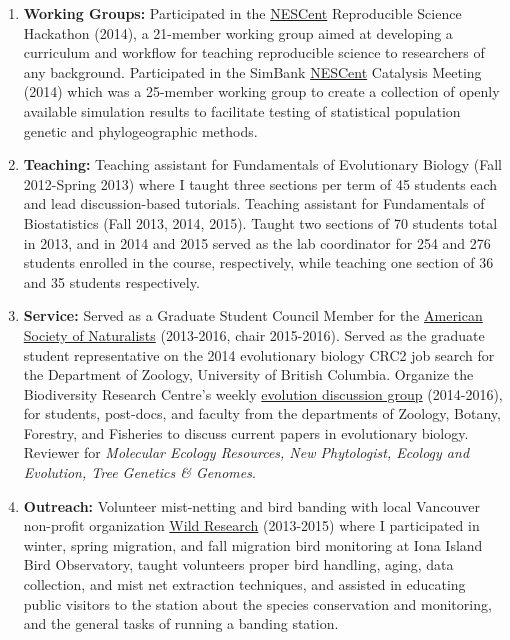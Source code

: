 \begin{enumerate}[itemsep=-0.25ex]
\item \textbf{Working Groups:} Participated in the \href{http://www.nescent.org/}{NESCent} Reproducible Science Hackathon (2014), a 21-member working group aimed at developing a curriculum and workflow for teaching reproducible science to researchers of any background. Participated in the SimBank \href{http://www.nescent.org/}{NESCent} Catalysis Meeting (2014) which was a 25-member working group to create a collection of openly available simulation results to facilitate testing of statistical population genetic and phylogeographic methods.

\item \textbf{Teaching:} Teaching assistant for Fundamentals of Evolutionary Biology (Fall 2012-Spring 2013) where I taught three sections per term of 45 students each and lead discussion-based tutorials. Teaching assistant for Fundamentals of Biostatistics (Fall 2013, 2014, 2015). Taught two sections of 70 students total in 2013, and in 2014 and 2015 served as the lab coordinator for 254 and 276 students enrolled in the course, respectively, while teaching one section of 36 and 35 students respectively.

\item \textbf{Service:} Served as a Graduate Student Council Member for the \href {http://www.amnat.org/home.html}{American Society of Naturalists} (2013-2016, chair 2015-2016). Served as the graduate student representative on the 2014 evolutionary biology CRC2 job search for the Department of Zoology, University of British Columbia. Organize the Biodiversity Research Centre's weekly \href{http://www.biodiversity.ubc.ca/edg/}{evolution discussion group} (2014-2016), for students, post-docs, and faculty  from the departments of Zoology, Botany, Forestry, and Fisheries to discuss current papers in evolutionary biology. Reviewer for \emph{Molecular Ecology Resources, New Phytologist, Ecology and Evolution, Tree Genetics \& Genomes}.

\item \textbf{Outreach:}  Volunteer mist-netting and bird banding with local Vancouver non-profit organization \href {http://www.wildresearch.ca/IonaIsland.html}{Wild Research} (2013-2015) where I participated in winter, spring migration, and fall migration bird monitoring at Iona Island Bird Observatory, taught volunteers proper bird handling, aging, data collection, and mist net extraction techniques, and assisted in educating public visitors to the station about the species conservation and monitoring, and the general tasks of running a banding station.

\end{enumerate}

